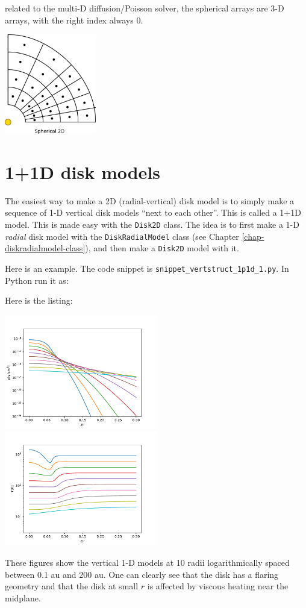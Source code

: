 \documentclass{book}
\newcommand{\code}[1]{{\small\tt #1}}
\begin{document}
\begin{itemize}
{  related to the multi-D diffusion/Poisson solver, the spherical arrays
  are 3-D arrays, with the right index always 0.}
    \parbox{0.4\textwidth}{\centerline{\includegraphics[width=0.3\textwidth]{disklab_grid_spher2d.pdf}}}
\end{itemize}

\section{1+1D disk models}
The easiest way to make a 2D (radial-vertical) disk model is to simply make a
sequence of 1-D vertical disk models ``next to each other''. This is called a
1+1D model. This is made easy with the \code{Disk2D} class. The idea is to
first make a 1-D {\em radial} disk model with the \code{DiskRadialModel} class (see
Chapter \ref{chap-diskradialmodel-class}), and then make a \code{Disk2D} model
with it.

Here is an example. The code snippet is
\code{snippet\_vertstruct\_1p1d\_1.py}. In Python run it as:
\begin{codebox}
\end{codebox}
Here is the listing:

\centerline{\includegraphics[width=0.5\textwidth]{../snippets/fig_snippet_vertstruct_1p1d_1_1.pdf}
\includegraphics[width=0.5\textwidth]{../snippets/fig_snippet_vertstruct_1p1d_1_2.pdf}}
%
These figures show the vertical 1-D models at 10 radii logarithmically spaced between
0.1 au and 200 au. One can clearly see that the disk has a flaring geometry and
that the disk at small $r$ is affected by viscous heating near the midplane.
\end{document}
